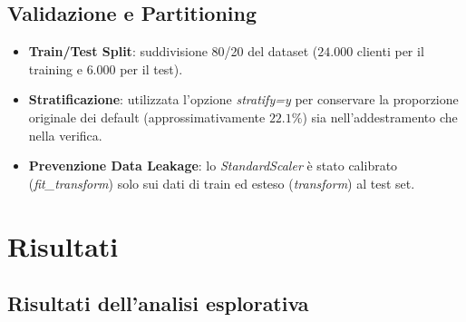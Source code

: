 \documentclass{article}
\begin{document}
\subsection{Validazione e Partitioning}
\begin{itemize}
    \item \textbf{Train/Test Split}: suddivisione 80/20 del dataset ($24.000$ clienti per il training e $6.000$ per il test).
    \item \textbf{Stratificazione}: utilizzata l'opzione \textit{stratify=y} per conservare la proporzione originale dei default (approssimativamente $22.1\%$) sia nell'addestramento che nella verifica.
    \item \textbf{Prevenzione Data Leakage}: lo \textit{StandardScaler} \`e stato calibrato (\textit{fit\_transform}) solo sui dati di train ed esteso (\textit{transform}) al test set.
\end{itemize}


\section{Risultati}
\subsection{Risultati dell'analisi esplorativa}
\end{document}
